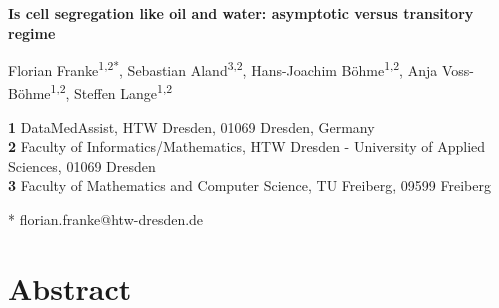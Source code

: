 \documentclass[10pt,letterpaper]{article}
\date{}
\begin{document}
\vspace*{0.2in}

\begin{flushleft} {\Large \textbf{Is cell segregation like oil and
      water: asymptotic versus transitory regime}\\[1mm]
  }


Florian Franke\textsuperscript{1,2*},
Sebastian Aland\textsuperscript{3,2},
Hans-Joachim B\"ohme\textsuperscript{1,2},
Anja Voss-B\"ohme\textsuperscript{1,2},
Steffen Lange\textsuperscript{1,2}

\bigskip
\textbf{1} DataMedAssist, HTW Dresden, 01069 Dresden, Germany
\\
\textbf{2} Faculty of Informatics/Mathematics, HTW Dresden - University
  of Applied Sciences, 01069 Dresden
\\
\textbf{3} Faculty of Mathematics and Computer Science, TU Freiberg, 09599 Freiberg
\\
\bigskip

* florian.franke{@}htw-dresden.de\\
\end{flushleft}

\section*{Abstract}
\end{document}

